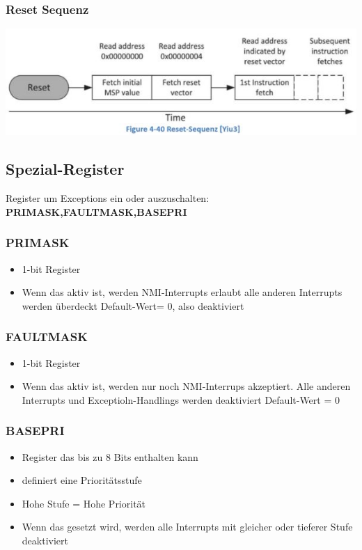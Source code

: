 \subsubsection{Reset Sequenz}
     \includegraphics{images/resetsequenz}
\subsection{Spezial-Register}     
Register um Exceptions ein oder auszuschalten:\\
\textbf{\rightarrow PRIMASK,FAULTMASK,BASEPRI}
\begin{multicols}{2}
    \subsubsection{PRIMASK}
    \begin{itemize}
        \item 1-bit Register
        \item Wenn das aktiv ist, werden NMI-Interrupts erlaubt
        \subitem \rightarrow alle anderen Interrupts werden überdeckt
        \subitem \rightarrow Default-Wert= 0, also deaktiviert
    \end{itemize}
    
    \subsubsection{FAULTMASK}
    \begin{itemize}
        \item 1-bit Register
        \item Wenn das aktiv ist, werden nur noch NMI-Interrups akzeptiert.\newline
        Alle anderen Interrupts und Exceptioln-Handlings werden deaktiviert
        \subitem \rightarrow Default-Wert = 0
    \end{itemize}
\end{multicols}

\subsubsection{BASEPRI}
\begin{itemize}
    \item Register das bis zu 8 Bits enthalten kann
    \item definiert eine Prioritätsstufe
    \item Hohe Stufe = Hohe Priorität
    \item Wenn das gesetzt wird, werden alle Interrupts mit gleicher oder tieferer Stufe deaktiviert
\end{itemize}

